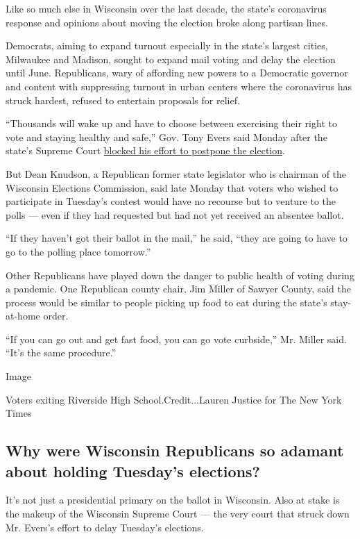 Like so much else in Wisconsin over the last decade, the state's
coronavirus response and opinions about moving the election broke along
partisan lines.

Democrats, aiming to expand turnout especially in the state's largest
cities, Milwaukee and Madison, sought to expand mail voting and delay
the election until June. Republicans, wary of affording new powers to a
Democratic governor and content with suppressing turnout in urban
centers where the coronavirus has struck hardest, refused to entertain
proposals for relief.

``Thousands will wake up and have to choose between exercising their
right to vote and staying healthy and safe,'' Gov. Tony Evers said
Monday after the state's Supreme Court
\href{https://www.nytimes3xbfgragh.onion/2020/04/06/us/politics/wisconsin-primary-voting-coronavirus.html}{blocked
his effort to postpone the election}.

But Dean Knudson, a Republican former state legislator who is chairman
of the Wisconsin Elections Commission, said late Monday that voters who
wished to participate in Tuesday's contest would have no recourse but to
venture to the polls --- even if they had requested but had not yet
received an absentee ballot.

``If they haven't got their ballot in the mail,'' he said, ``they are
going to have to go to the polling place tomorrow.''

Other Republicans have played down the danger to public health of voting
during a pandemic. One Republican county chair, Jim Miller of Sawyer
County, said the process would be similar to people picking up food to
eat during the state's stay-at-home order.

``If you can go out and get fast food, you can go vote curbside,'' Mr.
Miller said. ``It's the same procedure.''

Image

Voters exiting Riverside High School.Credit...Lauren Justice for The New
York Times

\hypertarget{why-were-wisconsin-republicans-so-adamant-about-holding-tuesdays-elections}{%
\subsection{Why were Wisconsin Republicans so adamant about holding
Tuesday's
elections?}\label{why-were-wisconsin-republicans-so-adamant-about-holding-tuesdays-elections}}

It's not just a presidential primary on the ballot in Wisconsin. Also at
stake is the makeup of the Wisconsin Supreme Court --- the very court
that struck down Mr. Evers's effort to delay Tuesday's elections.

